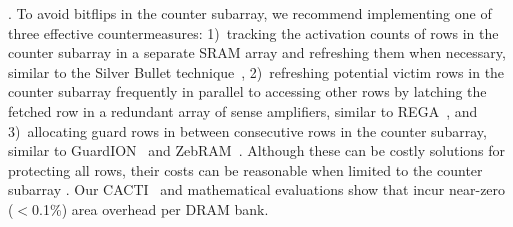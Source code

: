 .
To avoid bitflips in the counter subarray, we recommend implementing one of three effective countermeasures:
1)~tracking the activation counts of rows in the counter subarray in a separate SRAM array and refreshing them when necessary, similar to the Silver Bullet technique~\cite{devaux2021method, yaglikci2021security},
2)~refreshing potential victim rows in the counter subarray frequently in parallel to accessing other rows by latching the fetched row in a redundant array of sense amplifiers, similar to REGA~\cite{marazzi2023rega}, and
3)~allocating guard rows in between consecutive rows in the counter subarray, similar to GuardION~\cite{van2018guardion} and ZebRAM~\cite{razavi2016flip}.
Although these can be costly solutions for protecting all rows, their costs can be reasonable when limited to the counter subarray .
Our CACTI~\cite{cacti} and mathematical evaluations show that  incur near-zero ($<$0.1\%) area overhead per DRAM bank.

